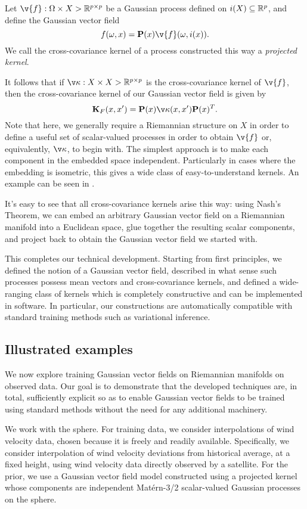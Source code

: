 \documentclass[11pt]{book}
\begin{document}
\begin{definition}
Let $\v{f} : \Omega \x X \-> \R^{p\x p}$ be a Gaussian process defined on $i(X) \subseteq \mathbb{R}^p$, and define the Gaussian vector field
\[
f(\omega, x) = \m{P}(x) \v{f}(\omega, i(x))
.
\]
We call the cross-covariance kernel of a process constructed this way a \emph{projected kernel}.
\end{definition}

It follows that if $\v\kappa : X \x X \-> \R^{p \x p}$ is the cross-covariance kernel of $\v{f}$, then the cross-covariance kernel of our Gaussian vector field is given by 
\[
\m{K}_F(x,x') = \m{P}(x) \v\kappa(x,x') \m{P}(x)^T
.    
\]
Note that here, we generally require a Riemannian structure on $X$ in order to define a useful set of scalar-valued processes in order to obtain $\v{f}$ or, equivalently, $\v\kappa$, to begin with.
The simplest approach is to make each component in the embedded space independent.
Particularly in cases where the embedding is isometric, this gives a wide class of easy-to-understand kernels.
An example can be seen in .

It's easy to see that all cross-covariance kernels arise this way: using Nash's Theorem, we can embed an arbitrary Gaussian vector field on a Riemannian manifold into a Euclidean space, glue together the resulting scalar components, and project back to obtain the Gaussian vector field we started with.

This completes our technical development. 
Starting from first principles, we defined the notion of a Gaussian vector field, described in what sense such processes possess mean vectors and cross-covariance kernels, and defined a wide-ranging class of kernels which is completely constructive and can be implemented in software.
In particular, our constructions are automatically compatible with standard training methods such as variational inference.

\subsection{Illustrated examples}

We now explore training Gaussian vector fields on Riemannian manifolds on observed data. 
Our goal is to demonstrate that the developed techniques are, in total, sufficiently explicit so as to enable Gaussian vector fields to be trained using standard methods without the need for any additional machinery.

We work with the sphere.
For training data, we consider interpolations of wind velocity data, chosen because it is freely and readily available.
Specifically, we consider interpolation of wind velocity deviations from historical average, at a fixed height, using wind velocity data directly observed by a satellite.
For the prior, we use a Gaussian vector field model constructed using a projected kernel whose components are independent Matérn-3/2 scalar-valued Gaussian processes on the sphere.
\end{document}
